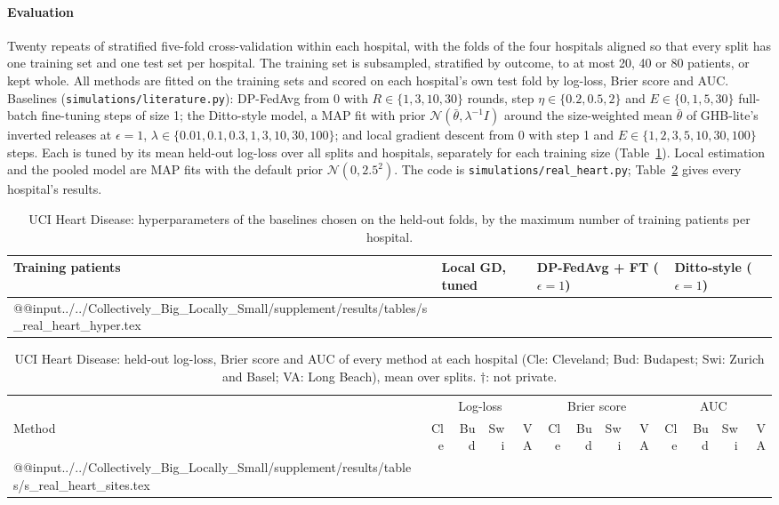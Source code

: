 \documentclass[acmsmall,screen,nonacm]{acmart}
\theoremstyle{acmdefinition}
\begin{document}
\paragraph{Evaluation} Twenty repeats of stratified five-fold cross-validation within each hospital, with the folds of the four hospitals aligned so that every split has one training set and one test set per hospital. The training set is subsampled, stratified by outcome, to at most 20, 40 or 80 patients, or kept whole. All methods are fitted on the training sets and scored on each hospital's own test fold by log-loss, Brier score and AUC. Baselines (\texttt{simulations/literature.py}): DP-FedAvg \cite{mcmahan2018learning} from 0 with $R\in\{1,3,10,30\}$ rounds, step $\eta\in\{0.2,0.5,2\}$ and $E\in\{0,1,5,30\}$ full-batch fine-tuning steps of size 1; the Ditto-style \cite{li2021ditto} model, a MAP fit with prior $\mathcal{N}(\bar\theta,\lambda^{-1}I)$ around the size-weighted mean $\bar\theta$ of GHB-lite's inverted releases at $\epsilon=1$, $\lambda\in\{0.01,0.1,0.3,1,3,10,30,100\}$; and local gradient descent from 0 with step 1 and $E\in\{1,2,3,5,10,30,100\}$ steps. Each is tuned by its mean held-out log-loss over all splits and hospitals, separately for each training size (Table~\ref{tab:real-hyper}). Local estimation and the pooled model are MAP fits with the default prior $\mathcal{N}(0,2.5^2)$. The code is \texttt{simulations/real\_heart.py}; Table~\ref{tab:real-sites} gives every hospital's results.

\begin{table}[t]
\caption{UCI Heart Disease: hyperparameters of the baselines chosen on the held-out folds, by the maximum number of training patients per hospital.}
\label{tab:real-hyper}
\footnotesize
\begin{tabular}{@{}llll@{}}
\toprule
Training patients & Local GD, tuned & DP-FedAvg \cite{mcmahan2018learning} + FT ($\epsilon=1$) & Ditto-style \cite{li2021ditto} ($\epsilon=1$)\\
\midrule
\csname @@input\endcsname../../Collectively_Big_Locally_Small/supplement/results/tables/s_real_heart_hyper.tex 
\bottomrule
\end{tabular}
\end{table}

\begin{table}[t]
\caption{UCI Heart Disease: held-out log-loss, Brier score and AUC of every method at each hospital (Cle: Cleveland; Bud: Budapest; Swi: Zurich and Basel; VA: Long Beach), mean over \SimRealHeartSplits{} splits. $\dagger$: not private.}
\label{tab:real-sites}
\scriptsize
\setlength{\tabcolsep}{2.6pt}
\begin{tabular}{@{}lrrrrrrrrrrrr@{}}
\toprule
 & \multicolumn{4}{c}{Log-loss} & \multicolumn{4}{c}{Brier score} & \multicolumn{4}{c}{AUC}\\
\cmidrule(lr){2-5}\cmidrule(lr){6-9}\cmidrule(l){10-13}
Method & Cle & Bud & Swi & VA & Cle & Bud & Swi & VA & Cle & Bud & Swi & VA\\
\midrule
\csname @@input\endcsname../../Collectively_Big_Locally_Small/supplement/results/tables/s_real_heart_sites.tex 
\bottomrule
\end{tabular}
\end{table}
\end{document}
